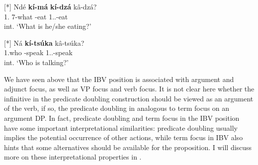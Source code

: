 \documentclass[output=paper,colorlinks,citecolor=brown,
]{langscibook}
\begin{document}
\begin{exe}
\ex
[*]{
\label{60}
\gll
Ndé \textbf{kí-má} \textbf{kí-dzá} kâ-dzá?\\
1.\Pro{} 7-what \Inf{}-eat 1.\Sm{}.\Prs{}-eat\\
\trans int. ‘What is he/she eating?’
}

\end{exe}
\begin{exe}
\ex
[*]{
\label{61}
\gll
Ná \textbf{kí-tsúka} kâ-tsúka?\\
1.who \Inf{}-speak 1.\Sm{}.\Prs{}-speak\\
\trans int. ‘Who is talking?’
}

\end{exe}
We have seen above that the IBV position is associated with argument and adjunct focus, as well as VP focus and verb focus. It is not clear here whether the infinitive in the predicate doubling construction should be viewed as an argument of the verb, if so, the predicate doubling in analogous to term focus on an argument DP. In fact, predicate doubling and term focus in the IBV position have some important interpretational similarities: predicate doubling usually implies the potential occurrence of other actions, while term focus in IBV also hints that some alternatives should be available for the proposition. I will discuss more on these interpretational properties in .
\end{document}
